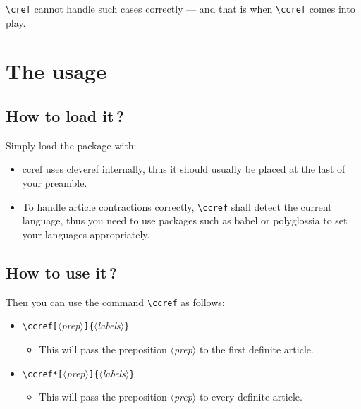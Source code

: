 \documentclass[classical]{einfart}
\providecommand{\meta}[1]{$\langle${\normalfont\itshape#1}$\rangle$}
\newenvironment{tip}[1][Tip]{%
    \LocallyStopLineNumbers%
    \begin{tcolorbox}[breakable,
        enhanced,
        width = \textwidth,
        colback = paper, colbacktitle = paper,
        colframe = gray!50, boxrule=0.2mm,
        coltitle = black,
        fonttitle = \sffamily,
        attach boxed title to top left = {yshift=-\tcboxedtitleheight/2, xshift=.5cm},
        boxed title style = {boxrule=0pt, colframe=paper},
        before skip = 0.3cm,
        after skip = 0.3cm,
        top = 3mm,
        bottom = 3mm,
        title={\scshape\sffamily #1}]%
}{\end{tcolorbox}\ResumeLineNumbers}
\newcommand{\ccrefpackage}{\textsf{ccref}}
\begin{document}
\lstinline|\cref| cannot handle such cases correctly --- and that is when \lstinline|\ccref| comes into play.


\section{The usage}

\subsection[How to load it]{How to load it\,?}

Simply load the package with:

\begin{code}
\usepackage{ccref}
\end{code}

\begin{tip}
    \begin{itemize}\small
        \item \ccrefpackage{} uses \textsf{cleveref} internally, thus it should usually be placed at the last of your preamble.
        \item To handle article contractions correctly, \lstinline|\ccref| shall detect the current language, thus you need to use packages such as \textsf{babel} or \textsf{polyglossia} to set your languages appropriately.
    \end{itemize}
\end{tip}

\subsection[How to use it]{How to use it\,?}

Then you can use the command \lstinline|\ccref| as follows:
\begin{itemize}
    \item \lstinline|\ccref[|\meta{prep}\lstinline|]{|\meta{labels}\lstinline|}|
    \begin{itemize}
        \item This will pass the preposition \meta{prep} to the first definite article.
    \end{itemize}
    \item \lstinline|\ccref*[|\meta{prep}\lstinline|]{|\meta{labels}\lstinline|}|
    \begin{itemize}
        \item This will pass the preposition \meta{prep} to every definite article.
    \end{itemize}
\end{itemize}
\end{document}
